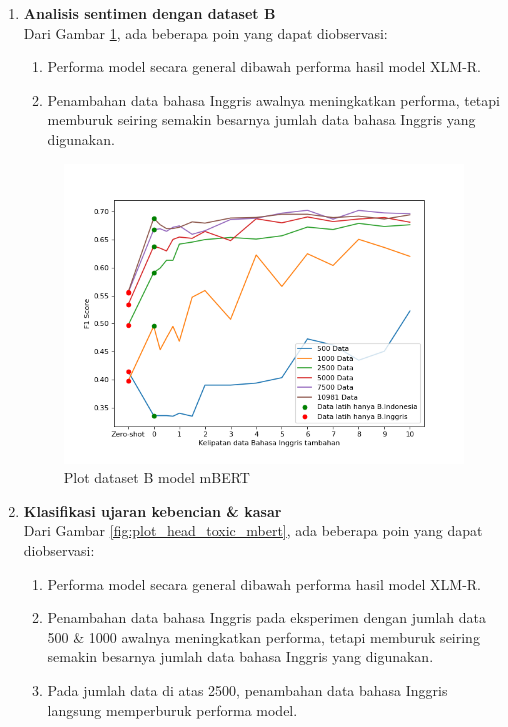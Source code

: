 \begin{enumerate}
            \item \textbf{Analisis sentimen dengan dataset B} \\
            Dari Gambar \ref{fig:plot_head_prosa_mbert}, ada beberapa poin yang dapat diobservasi:
            \begin{enumerate}
                \item Performa model secara general dibawah performa hasil model XLM-R.
                \item Penambahan data bahasa Inggris awalnya meningkatkan performa, tetapi memburuk seiring semakin besarnya jumlah data bahasa Inggris yang digunakan.
            \end{enumerate}

            \begin{figure}[htb]
                \centering
                \includegraphics[width=\linewidth]{resources/plot-head-prosa-mbert.png}
                \caption{Plot dataset B model mBERT}
                \label{fig:plot_head_prosa_mbert}
            \end{figure}
        
            \item \textbf{Klasifikasi ujaran kebencian \& kasar} \\
            Dari Gambar \ref{fig:plot_head_toxic_mbert}, ada beberapa poin yang dapat diobservasi:
            \begin{enumerate}
                \item Performa model secara general dibawah performa hasil model XLM-R.
                \item Penambahan data bahasa Inggris pada eksperimen dengan jumlah data 500 \& 1000 awalnya meningkatkan performa, tetapi memburuk seiring semakin besarnya jumlah data bahasa Inggris yang digunakan.
                \item Pada jumlah data di atas 2500, penambahan data bahasa Inggris langsung memperburuk performa model.
            \end{enumerate}


\end{enumerate}
